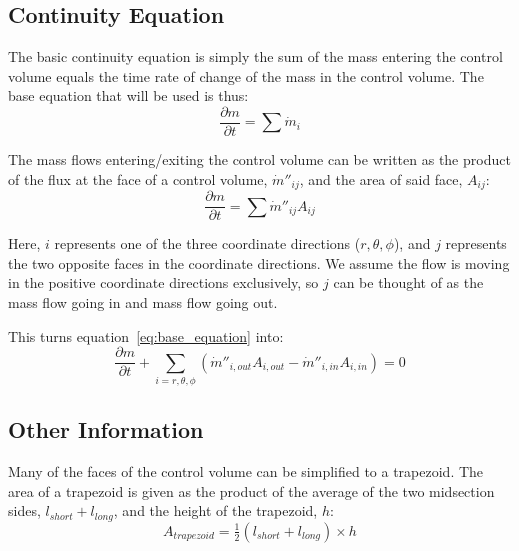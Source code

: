 \documentclass[12pt, letterpaper, twoside]{article}
\begin{document}
\subsection{Continuity Equation}
    The basic continuity equation is simply the sum of the mass entering the control volume equals the time rate of change of the mass in the control volume. The base equation that will be used is thus:
    \begin{equation*}
        \frac{\partial m}{\partial t} = \sum \dot{m}_i
    \end{equation*}

    The mass flows entering/exiting the control volume can be written as the product of the flux at the face of a control volume, \(\dot{m}''_{ij}\), and the area of said face, \(A_{ij}\):
    \begin{equation}
        \frac{\partial m}{\partial t} = \sum \dot{m}''_{ij} A_{ij}
        \label{eq:base_equation}
    \end{equation}

    Here, \(i\) represents one of the three coordinate directions (\(r, \theta, \phi\)), and \(j\) represents the two opposite faces in the coordinate directions. We assume the flow is moving in the positive coordinate directions exclusively, so \(j\) can be thought of as the mass flow going in and mass flow going out.

    This turns equation~\ref{eq:base_equation} into:
    \begin{equation}
        \frac{\partial m}{\partial t} + 
        \sum_{i=r, \theta, \phi}
        (\dot{m}''_{i,out} A_{i,out} - \dot{m}''_{i,in} A_{i,in}) = 0 
        \label{eq:base_equation_full}
    \end{equation}


\subsection{Other Information} \label{sect:otherinfo}
Many of the faces of the control volume can be simplified to a trapezoid. The area of a trapezoid is given as the product of the average of the two midsection sides, \(l_{short} + l_{long}\), and the height of the trapezoid, \(h\):
%
\begin{equation}
    A_{trapezoid} = \tfrac{1}{2} (l_{short} + l_{long}) \times h
    \label{eq:traparea}
\end{equation}
\end{document}
